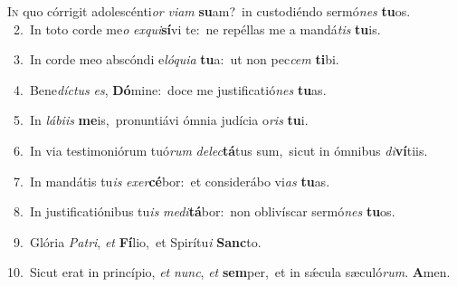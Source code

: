 \lettrine{\initial\textcolor{\initialcolor}{I}}{n} quo córrigit adolescénti\textit{or} \textit{vi}\-\textit{am} \textbf{su}\-am?~\star in custodiéndo sermó\textit{nes} \textbf{tu}\-os.\\
{\numbfont\textcolor{\numbcolor}{~2.}}~In toto corde me\textit{o} \textit{ex}\-\textit{qui}\textbf{sí}vi te:~\star ne repéllas me a mandá\textit{tis} \textbf{tu}\-is.\par
{\numbfont\textcolor{\numbcolor}{~3.}}~In corde meo abscóndi e\-\textit{ló}\-\textit{qui}\textit{a} \textbf{tu}\-a:~\star ut non pec\textit{cem} \textbf{ti}\-bi.\par
{\numbfont\textcolor{\numbcolor}{~4.}}~Bene\-\textit{díc}\-\textit{tus} \textit{es}\-, \textbf{Dó}\-mine:~\star doce me justificatió\textit{nes} \textbf{tu}\-as.\par
{\numbfont\textcolor{\numbcolor}{~5.}}~In \textit{lá}\-\textit{bi}\textit{is} \textbf{me}\-is,~\star pronuntiávi ómnia judícia o\textit{ris} \textbf{tu}\-i.\par
{\numbfont\textcolor{\numbcolor}{~6.}}~In via testimoniórum tuó\textit{rum} \textit{de}\-\textit{lec}\textbf{tá}tus sum,~\star sicut in ómnibus \textit{di}\-\textbf{ví}tiis.\par
{\numbfont\textcolor{\numbcolor}{~7.}}~In mandátis tu\textit{is} \textit{ex}\-\textit{er}\textbf{cé}bor:~\star et considerábo vi\textit{as} \textbf{tu}\-as.\par
{\numbfont\textcolor{\numbcolor}{~8.}}~In justificatiónibus tu\textit{is} \textit{me}\-\textit{di}\textbf{tá}bor:~\star non oblivíscar sermó\textit{nes} \textbf{tu}\-os.\par
{\numbfont\textcolor{\numbcolor}{~9.}}~Glória \textit{Pa}\-\textit{tri}, \textit{et} \textbf{Fí}\-lio,~\star et Spirítu\textit{i} \textbf{Sanc}\-to.\par
{\numbfont\textcolor{\numbcolor}{10.}}~Sicut erat in princípio, \textit{et} \textit{nunc}\-, \textit{et} \textbf{sem}\-per,~\star et in sǽcula sæculó\-\textit{rum}\-. \textbf{A}\-men.\par
